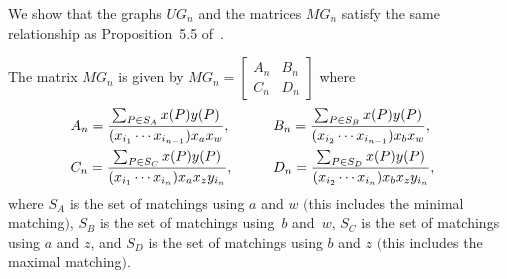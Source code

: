 We show that the graphs $UG_n$ and the matrices $MG_n$ satisfy the same relationship as Proposition~5.5 of~\cite{MW}.

\begin{Proposition}\label{prop:MatchingMatrices}
The matrix $MG_n$ is given by $MG_n = \left[\begin{smallmatrix} A_n & B_n \\ C_n & D_n \end{smallmatrix}\right]$ where
\begin{alignat*}{3}
& A_n = \frac{\sum_{P \in S_A} x(P) y(P)}{(x_{i_1}\cdots x_{i_{n-1}}) x_ax_w}, \qquad && B_n = \frac{\sum_{P \in S_B} x(P) y(P)}{(x_{i_2}\cdots x_{i_{n-1}}) x_bx_w},&
\vspace{1mm}\\
& C_n = \frac{\sum_{P \in S_C} x(P) y(P)}{(x_{i_1}\cdots x_{i_{n}}) x_ax_z y_{i_n}}, \qquad && D_n = \frac{\sum_{P \in S_D} x(P) y(P)}{(x_{i_2}\cdots x_{i_{n}}) x_bx_z y_{i_n}}, &
\end{alignat*}
where $S_A$ is the set of matchings using $a$ and $w$ $($this includes the minimal matching$)$, $S_B$ is the set of matchings using~$b$ and~$w$, $S_C$ is the set of matchings using $a$ and $z$, and $S_D$ is the set of matchings using $b$ and $z$ $($this includes the maximal matching$)$.
\end{Proposition}

